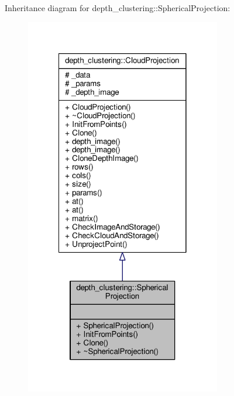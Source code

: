 Inheritance diagram for depth\-\_\-clustering\-:\-:Spherical\-Projection\-:
\nopagebreak
\begin{figure}[H]
\begin{center}
\leavevmode
\includegraphics[width=242pt]{classdepth__clustering_1_1SphericalProjection__inherit__graph}
\end{center}
\end{figure}


